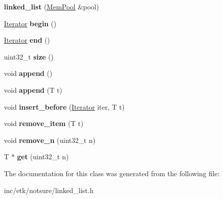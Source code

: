 \begin{DoxyCompactItemize}
\item 
\hypertarget{classetk_1_1linked__list_a5e79c0c51304c34bfcb0cbcfabd247ba}{{\bfseries linked\-\_\-list} (\hyperlink{classetk_1_1_mem_pool}{Mem\-Pool} \&pool)}\label{classetk_1_1linked__list_a5e79c0c51304c34bfcb0cbcfabd247ba}

\item 
\hypertarget{classetk_1_1linked__list_aee7c87bd9c31bda1d3439ffd618c50e1}{\hyperlink{classetk_1_1linked__list_1_1_iterator}{Iterator} {\bfseries begin} ()}\label{classetk_1_1linked__list_aee7c87bd9c31bda1d3439ffd618c50e1}

\item 
\hypertarget{classetk_1_1linked__list_a0c374669804b75472c2c4a9232698790}{\hyperlink{classetk_1_1linked__list_1_1_iterator}{Iterator} {\bfseries end} ()}\label{classetk_1_1linked__list_a0c374669804b75472c2c4a9232698790}

\item 
\hypertarget{classetk_1_1linked__list_a86db557eb4774001dd0f744537473991}{uint32\-\_\-t {\bfseries size} ()}\label{classetk_1_1linked__list_a86db557eb4774001dd0f744537473991}

\item 
\hypertarget{classetk_1_1linked__list_afa191e83f1294ac4d422bb3cae477e7f}{void {\bfseries append} ()}\label{classetk_1_1linked__list_afa191e83f1294ac4d422bb3cae477e7f}

\item 
\hypertarget{classetk_1_1linked__list_aeb20b490195f9750433eb07d9f7d0c74}{void {\bfseries append} (T t)}\label{classetk_1_1linked__list_aeb20b490195f9750433eb07d9f7d0c74}

\item 
\hypertarget{classetk_1_1linked__list_aaa600ef96340b97c17ff9f1264290a5e}{void {\bfseries insert\-\_\-before} (\hyperlink{classetk_1_1linked__list_1_1_iterator}{Iterator} iter, T t)}\label{classetk_1_1linked__list_aaa600ef96340b97c17ff9f1264290a5e}

\item 
\hypertarget{classetk_1_1linked__list_a0d4dee6f5b96b4b99c3e697b1598df88}{void {\bfseries remove\-\_\-item} (T t)}\label{classetk_1_1linked__list_a0d4dee6f5b96b4b99c3e697b1598df88}

\item 
\hypertarget{classetk_1_1linked__list_a27fb9199bfa95f71b522f2b71c4f5ce0}{void {\bfseries remove\-\_\-n} (uint32\-\_\-t n)}\label{classetk_1_1linked__list_a27fb9199bfa95f71b522f2b71c4f5ce0}

\item 
\hypertarget{classetk_1_1linked__list_a4707f5352ec718e33c19b15ab6a789a1}{T $\ast$ {\bfseries get} (uint32\-\_\-t n)}\label{classetk_1_1linked__list_a4707f5352ec718e33c19b15ab6a789a1}

\end{DoxyCompactItemize}


The documentation for this class was generated from the following file\-:\begin{DoxyCompactItemize}
\item 
inc/etk/notsure/linked\-\_\-list.\-h\end{DoxyCompactItemize}

